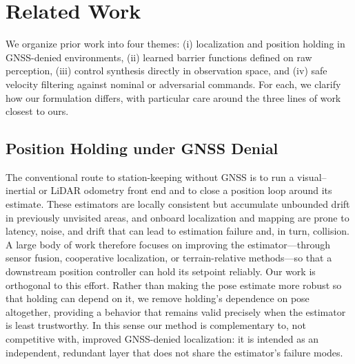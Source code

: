 \documentclass[11pt]{article}
\begin{document}
\section{Related Work}
\label{sec:related}

We organize prior work into four themes: (i) localization and position
holding in GNSS-denied environments, (ii) learned barrier functions defined
on raw perception, (iii) control synthesis directly in observation space, and
(iv) safe velocity filtering against nominal or adversarial commands. For each,
we clarify how our formulation differs, with particular care around the three
lines of work closest to ours.

\subsection{Position Holding under GNSS Denial}
The conventional route to station-keeping without GNSS is to run a
visual--inertial or LiDAR odometry front end and to close a position loop
around its estimate. These estimators are locally consistent but accumulate
unbounded drift in previously unvisited areas\cite{sprind2025}, and onboard
localization and mapping are prone to latency, noise, and drift that can lead
to estimation failure and, in turn, collision\cite{neuralcbf2024}. A large
body of work therefore focuses on improving the estimator---through sensor
fusion, cooperative localization, or terrain-relative
methods\cite{sprind2025}---so that a downstream position controller can hold
its setpoint reliably. Our work is orthogonal to this effort. Rather than
making the pose estimate more robust so that holding can depend on it, we
remove holding's dependence on pose altogether, providing a behavior that
remains valid precisely when the estimator is least trustworthy. In this sense
our method is complementary to, not competitive with, improved GNSS-denied
localization: it is intended as an independent, redundant layer that does not
share the estimator's failure modes.
\end{document}
